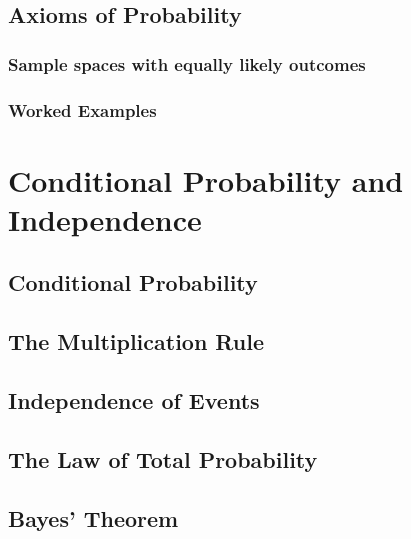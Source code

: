 \documentclass[
  12pt,
]{krantzNoCorner}
\begin{document}
\hypertarget{axioms-of-probability}{%
\section{Axioms of Probability}\label{axioms-of-probability}}

\hypertarget{sample-spaces-with-equally-likely-outcomes}{%
\subsection{Sample spaces with equally likely outcomes}\label{sample-spaces-with-equally-likely-outcomes}}

\hypertarget{worked-examples-1}{%
\subsection{Worked Examples}\label{worked-examples-1}}

\hypertarget{conditional-probability-and-independence}{%
\chapter{Conditional Probability and Independence}\label{conditional-probability-and-independence}}

\hypertarget{conditional-probability}{%
\section{Conditional Probability}\label{conditional-probability}}

\hypertarget{the-multiplication-rule}{%
\section{The Multiplication Rule}\label{the-multiplication-rule}}

\hypertarget{independence-of-events}{%
\section{Independence of Events}\label{independence-of-events}}

\hypertarget{the-law-of-total-probability}{%
\section{The Law of Total Probability}\label{the-law-of-total-probability}}

\hypertarget{bayes-theorem}{%
\section{Bayes' Theorem}\label{bayes-theorem}}
\end{document}
